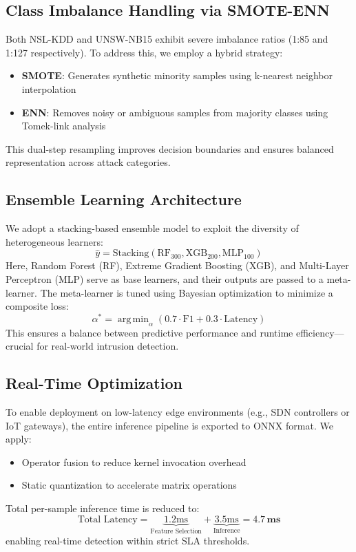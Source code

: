\documentclass[conference]{IEEEtran}
\DeclareMathOperator*{\argmin}{arg\,min}
\begin{document}
\subsection{Class Imbalance Handling via SMOTE-ENN}
Both NSL-KDD and UNSW-NB15 exhibit severe imbalance ratios (1:85 and 1:127 respectively). To address this, we employ a hybrid strategy:
\begin{itemize}
    \item \textbf{SMOTE}: Generates synthetic minority samples using k-nearest neighbor interpolation
    \item \textbf{ENN}: Removes noisy or ambiguous samples from majority classes using Tomek-link analysis
\end{itemize}
This dual-step resampling improves decision boundaries and ensures balanced representation across attack categories.

\subsection{Ensemble Learning Architecture}
We adopt a stacking-based ensemble model to exploit the diversity of heterogeneous learners:
\begin{equation}
\hat{y} = \text{Stacking}\left(\text{RF}_{300}, \text{XGB}_{200}, \text{MLP}_{100}\right)
\end{equation}
Here, Random Forest (RF), Extreme Gradient Boosting (XGB), and Multi-Layer Perceptron (MLP) serve as base learners, and their outputs are passed to a meta-learner. The meta-learner is tuned using Bayesian optimization to minimize a composite loss:
\begin{equation}
\alpha^* = \argmin_{\alpha} \left(0.7\cdot\text{F1} + 0.3\cdot\text{Latency}\right)
\end{equation}
This ensures a balance between predictive performance and runtime efficiency—crucial for real-world intrusion detection.

\subsection{Real-Time Optimization}
To enable deployment on low-latency edge environments (e.g., SDN controllers or IoT gateways), the entire inference pipeline is exported to ONNX format. We apply:
\begin{itemize}
    \item Operator fusion to reduce kernel invocation overhead
    \item Static quantization to accelerate matrix operations
\end{itemize}
Total per-sample inference time is reduced to:
\begin{equation}
\text{Total Latency} = \underbrace{1.2\text{ms}}_{\text{Feature Selection}} + \underbrace{3.5\text{ms}}_{\text{Inference}} = \mathbf{4.7\,ms}
\end{equation}
enabling real-time detection within strict SLA thresholds.
\end{document}
